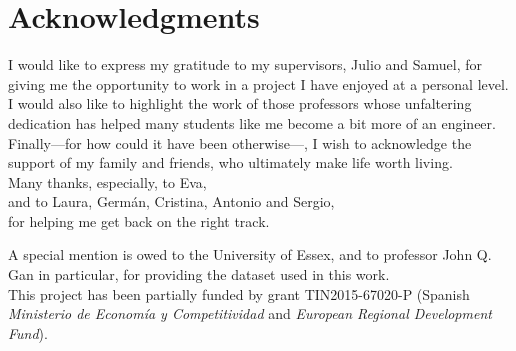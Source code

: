 
\begingroup
\chapter*{Acknowledgments}

I would like to express my gratitude to my supervisors, Julio and Samuel, for giving me the opportunity to work in a project I have enjoyed at a personal level. \\

\noindent
I would also like to highlight the work of those professors whose unfaltering dedication has helped many students like me become a bit more of an engineer. \\

\noindent
Finally---for how could it have been otherwise---, I wish to acknowledge the support of my family and friends, who ultimately make life worth living. \\

\noindent
Many thanks, especially, to Eva, \\
and to Laura, Germán, Cristina, Antonio and Sergio, \\
for helping me get back on the right track.

\vfill

\noindent
A special mention is owed to the University of Essex, and to professor John Q. Gan in particular, for providing the dataset used in this work. \\

\noindent
This project has been partially funded by grant TIN2015-67020-P (Spanish \textit{Ministerio de Economía y Competitividad} and \textit{European Regional Development Fund}).

\endgroup
